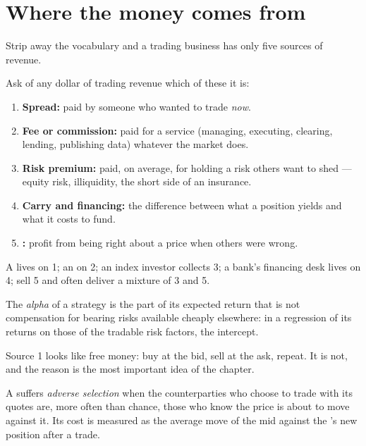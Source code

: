 \section{Where the money comes from}

Strip away the vocabulary and a trading business has only five sources of
revenue.

\begin{method}\label{met:m1:what-a-trading-firm-does:sources}
Ask of any dollar of trading revenue which of these it is:
\begin{enumerate}
\item \textbf{Spread:} paid by someone who wanted to trade \emph{now}.
\item \textbf{Fee or commission:} paid for a service (managing, executing,
  clearing, lending, publishing data) whatever the market does.
\item \textbf{Risk premium:} paid, on average, for holding a risk others
  want to shed --- equity risk, illiquidity, the short side of an insurance.
\item \textbf{Carry and financing:} the difference between what a position
  yields and what it costs to fund.
\item \textbf{:} profit from being right about a price when others were
  wrong.
\end{enumerate}
A  lives on 1; an  on 2; an index investor collects
3; a bank's financing desk lives on 4;  sell 5 and often deliver a
mixture of 3 and 5.
\end{method}

\begin{definition}[Alpha]\label{def:m1:what-a-trading-firm-does:alpha}
The \emph{alpha} of a strategy is the part of its expected
return that is not compensation for bearing risks available cheaply
elsewhere: in a regression of its returns on those of the tradable risk
factors, the intercept.
\end{definition}

Source 1 looks like free money: buy at the bid, sell at the ask, repeat. It
is not, and the reason is the most important idea of the chapter.

\begin{definition}\label{def:m1:what-a-trading-firm-does:adverse-selection}
A  suffers \emph{adverse selection}
when the counterparties who choose to trade with its quotes are, more often
than chance, those who know the price is about to move against it. Its cost
is measured as the average move of the mid against the 's new
position after a trade.
\end{definition}

